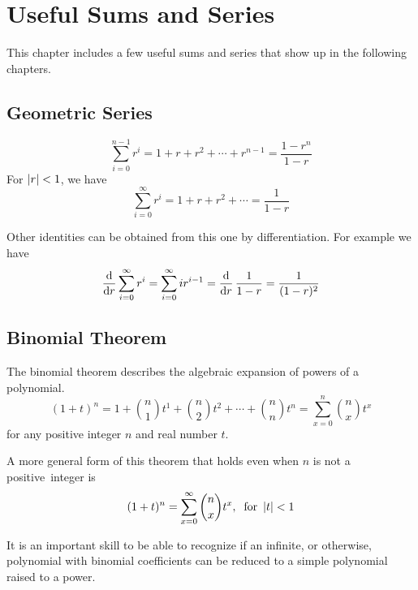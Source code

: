 \chapter{Useful Sums and Series}
This chapter includes a few useful sums and series that show up in the following chapters.
\section{Geometric Series}
\[
    \sum_{i = 0}^{n-1} r^i = 1 + r + r^2 + \cdots + r^{n-1} = \frac{1-r^n}{1-r}
\]
For $\left|r\right| < 1$, we have
\[
    \sum_{i = 0}^{\infty} r^i = 1 + r + r^2 + \cdots = \frac{1}{1-r}
\]
\begin{info}
Other identities can be obtained from this one by differentiation. For example we have
\[
    \frac{\operatorname{d}\!{}}{\operatorname{d}\!{r}}\sum_{i = 0}^{\infty} r^i = \sum_{i = 0}^{\infty} ir^{i-1} = \frac{\operatorname{d}\!{}}{\operatorname{d}\!{r}}\,\frac{1}{1-r} = \frac{1}{(1-r)^2}
\]
\end{info}
\section{Binomial Theorem}
The binomial theorem describes the algebraic expansion of powers of a polynomial.
\[
    (1 + t)^n = 1 + \binom{n}{1}t^1 + \binom{n}{2}t^2 + \cdots + \binom{n}{n}t^n = \sum_{x = 0}^{n} \binom{n}{x} t^x
\]
for any positive integer $n$ and real number $t$.
\par\smallskip
A more general form of this theorem that holds even when $n$ is not a positive~integer is
\[
    (1 + t)^n = \sum_{x = 0}^{\infty} \binom{n}{x} t^x,\:\text{ for } \left|t\right| < 1
\]
\begin{info}
It is an important skill to be able to recognize if an infinite, or otherwise, polynomial with binomial coefficients can be reduced to a simple polynomial raised to a power.
\end{info}